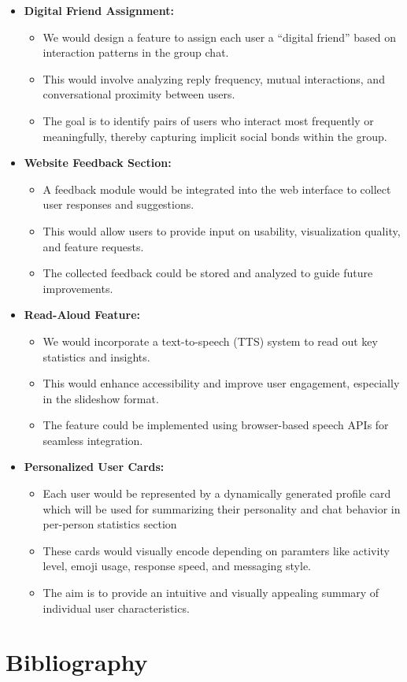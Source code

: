\documentclass[11pt,a4paper]{article}
\begin{document}
\begin{itemize}

\item \textbf{Digital Friend Assignment:}
\begin{itemize}
    \item We would design a feature to assign each user a ``digital friend'' based on interaction patterns in the group chat.
    \item This would involve analyzing reply frequency, mutual interactions, and conversational proximity between users.
    \item The goal is to identify pairs of users who interact most frequently or meaningfully, thereby capturing implicit social bonds within the group.
\end{itemize}

\item \textbf{Website Feedback Section:}
\begin{itemize}
    \item A feedback module would be integrated into the web interface to collect user responses and suggestions.
    \item This would allow users to provide input on usability, visualization quality, and feature requests.
    \item The collected feedback could be stored and analyzed to guide future improvements.
\end{itemize}

\item \textbf{Read-Aloud Feature:}
\begin{itemize}
    \item We would incorporate a text-to-speech (TTS) system to read out key statistics and insights.
    \item This would enhance accessibility and improve user engagement, especially in the slideshow format.
    \item The feature could be implemented using browser-based speech APIs for seamless integration.
\end{itemize}

\item \textbf{Personalized User Cards:}
\begin{itemize}
    \item Each user would be represented by a dynamically generated profile card which will be used for summarizing their personality and chat behavior in per-person statistics section
    \item These cards would visually encode depending on paramters like activity level, emoji usage, response speed, and messaging style.
    \item The aim is to provide an intuitive and visually appealing summary of individual user characteristics.
\end{itemize}

\end{itemize}

\section{Bibliography}

\printbibliography
\end{document}
